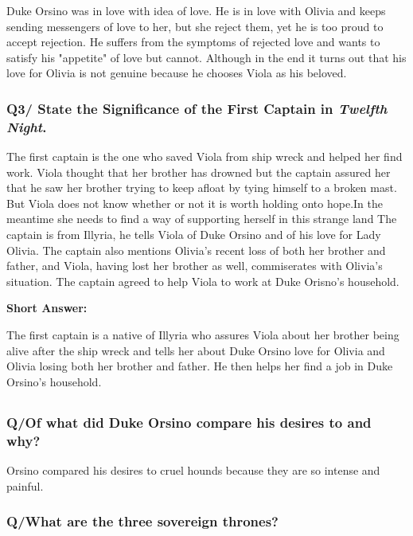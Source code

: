 \documentclass[12pt, a4paper]{article}
\begin{document}
Duke Orsino was in love with idea of love. He is in love with Olivia
and keeps sending messengers of love to her, but she reject them, yet he 
is too proud to accept rejection. He suffers from the symptoms of 
rejected love and wants to satisfy his "appetite" of love but cannot.
Although in the end it turns out that his love for Olivia is not genuine
because he chooses Viola as his beloved.

\subsubsection*{Q3/ State the Significance of the First Captain in 
\textit{Twelfth Night}.}

The first captain is the one who saved Viola from ship wreck and 
helped her find work. Viola thought that her brother has drowned but 
the captain assured her that he saw her brother trying to keep afloat 
by tying himself to a broken mast. But Viola does not know whether 
or not it is worth holding onto hope.In the meantime she needs to find 
a way of supporting herself in this strange land The captain is from 
Illyria, he tells Viola of Duke Orsino and of his love for Lady Olivia. 
The captain also mentions Olivia's recent loss of both her brother and 
father,  and Viola, having lost her brother as well, commiserates with 
Olivia's situation. The captain agreed to help Viola to work at Duke 
Orisno's household.\medbreak

\textbf{Short Answer:}\smallbreak

The first captain is a native of Illyria who assures Viola about her
brother being alive after the ship wreck and tells her about Duke Orsino
love for Olivia and Olivia losing both her brother and father. 
He then helps her find a job in Duke Orsino's household.

\subsection*{}\bigbreak

\subsubsection*{Q/Of what did Duke Orsino compare his desires to and why?}
Orsino compared his desires to cruel hounds because they are so intense 
and painful.

\subsubsection*{Q/What are the three sovereign thrones?}
\end{document}

